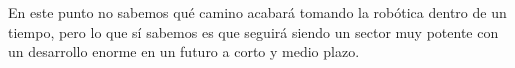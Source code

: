 \documentclass[a4paper,11pt]{article}
\begin{document}
\vspace{10px}

En este punto no sabemos qué camino acabará tomando la robótica dentro de un tiempo, pero lo que sí sabemos es que seguirá siendo un sector muy potente con un desarrollo enorme en un futuro a corto y medio plazo.

\normalsize


\onecolumn


\nocite{*}
\end{document}
